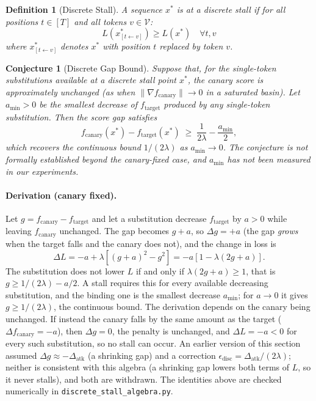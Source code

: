 \documentclass{article}
\newtheorem{conjecture}{Conjecture}
\newtheorem{definition}{Definition}
\begin{document}
\begin{definition}[Discrete Stall]
A sequence $x^*$ is at a \emph{discrete stall} if for all positions $t \in [T]$ and all tokens $v \in \mathcal{V}$:
\begin{equation}
L(x^*_{[t \leftarrow v]}) \geq L(x^*) \quad \forall t, v
\label{eq:discrete-stall}
\end{equation}
where $x^*_{[t \leftarrow v]}$ denotes $x^*$ with position $t$ replaced by token $v$.
\end{definition}

\begin{conjecture}[Discrete Gap Bound]
\label{prop:discrete-gap}
Suppose that, for the single-token substitutions available at a discrete stall point $x^*$, the canary score is approximately unchanged (as when $\|\nabla f_\text{canary}\| \to 0$ in a saturated basin). Let $a_{\min} > 0$ be the smallest decrease of $f_\text{target}$ produced by any single-token substitution. Then the score gap satisfies
\begin{equation}
f_\text{canary}(x^*) - f_\text{target}(x^*) \;\geq\; \frac{1}{2\lambda} - \frac{a_{\min}}{2},
\end{equation}
which recovers the continuous bound $1/(2\lambda)$ as $a_{\min} \to 0$. The conjecture is not formally established beyond the canary-fixed case, and $a_{\min}$ has not been measured in our experiments.
\end{conjecture}

\paragraph{Derivation (canary fixed).}
Let $g = f_\text{canary} - f_\text{target}$ and let a substitution decrease $f_\text{target}$ by $a > 0$ while leaving $f_\text{canary}$ unchanged. The gap becomes $g + a$, so $\Delta g = +a$ (the gap \emph{grows} when the target falls and the canary does not), and the change in loss is
\begin{equation}
\Delta L = -a + \lambda\left[(g+a)^2 - g^2\right] = -a\left[1 - \lambda(2g + a)\right].
\end{equation}
The substitution does not lower $L$ if and only if $\lambda(2g + a) \geq 1$, that is $g \geq 1/(2\lambda) - a/2$. A stall requires this for every available decreasing substitution, and the binding one is the smallest decrease $a_{\min}$; for $a \to 0$ it gives $g \geq 1/(2\lambda)$, the continuous bound. The derivation depends on the canary being unchanged. If instead the canary falls by the same amount as the target ($\Delta f_\text{canary} = -a$), then $\Delta g = 0$, the penalty is unchanged, and $\Delta L = -a < 0$ for every such substitution, so no stall can occur. An earlier version of this section assumed $\Delta g \approx -\Delta_\text{atk}$ (a shrinking gap) and a correction $\epsilon_\text{disc} = \Delta_\text{atk}/(2\lambda)$; neither is consistent with this algebra (a shrinking gap lowers both terms of $L$, so it never stalls), and both are withdrawn. The identities above are checked numerically in \texttt{discrete\_stall\_algebra.py}.
\end{document}
